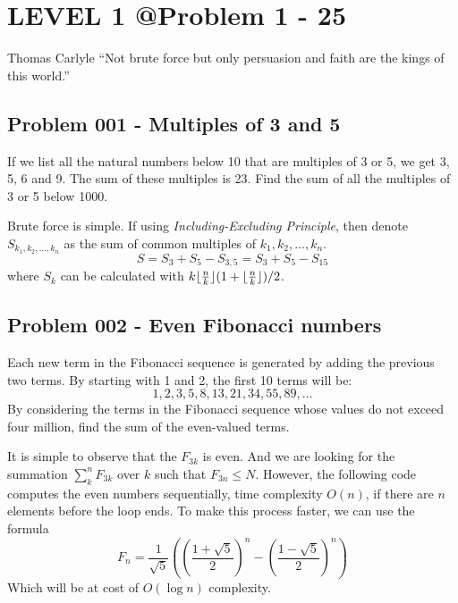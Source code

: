 \chapter{LEVEL 1 @Problem 1 - 25}

\begin{chapquote}{Thomas Carlyle}
	``Not brute force but only persuasion and faith are the kings of this world.''
\end{chapquote}

\section{Problem 001 - Multiples of 3 and 5}
\begin{prob}
If we list all the natural numbers below 10 that are multiples of 3 or 5, we get 3, 5, 6 and 9. The sum of these multiples is 23. Find the sum of all the multiples of 3 or 5 below 1000.
\end{prob}

\begin{sol}
Brute force is simple.
If using \emph{Including-Excluding Principle}, then denote $S_{k_1, k_2, \dots, k_n}$ as the sum of common multiples of $k_1, k_2,\dots,k_n$.
\begin{equation}
S = S_3 + S_5 - S_{3, 5} = S_3 + S_5 - S_{15}
\end{equation}
where $S_k$ can be calculated with $k\lfloor\frac{n}{k}\rfloor( 1 + \lfloor\frac{n}{k}\rfloor)/2$.
\end{sol}

\section{Problem 002 - Even Fibonacci numbers}
\begin{prob}
Each new term in the Fibonacci sequence is generated by adding the previous two terms. By starting with 1 and 2, the first 10 terms will be:	
	$$1, 2, 3, 5, 8, 13, 21, 34, 55, 89, \dots$$
By considering the terms in the Fibonacci sequence whose values do not exceed four million, find the sum of the even-valued terms.
\end{prob}

\begin{sol}
It is simple to observe that the $F_{3k}$ is even. And we are looking for the summation $\sum_{k}^n F_{3k}$  over $k$ such that $F_{3n} \le N$. However, the following code computes the even numbers sequentially, time complexity $O(n)$, if there are $n$ elements before the loop ends.
To make this process faster, we can use the formula
\begin{equation}
F_n = \frac{1}{\sqrt{5}}\left(\left(\frac{1 + \sqrt{5}}{2}\right)^n - \left(\frac{1 - \sqrt{5}}{2}\right)^n\right)
\end{equation}
Which will be at cost of $O(\log n)$ complexity.
\end{sol}

